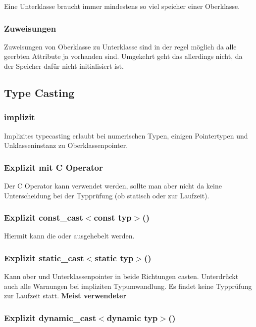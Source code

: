 Eine Unterklasse braucht immer mindestens so viel speicher einer Oberklasse.

\subsubsection{Zuweisungen}

Zuweisungen von Oberklasse zu Unterklasse sind in der regel möglich da alle geerbten Attribute ja vorhanden sind. 
Umgekehrt geht das allerdings nicht, da der Speicher dafür nicht initialisiert ist.

\subsection{Type Casting}

\subsubsection{implizit}

Implizites typecasting erlaubt bei numerischen Typen, einigen Pointertypen und Unklasseninstanz zu Oberklassenpointer. 

\subsubsection{Explizit mit C Operator}

Der C Operator \say{()} kann verwendet werden, sollte man aber nicht da keine Unterscheidung bei der Typprüfung (ob statisch oder zur Laufzeit). 

\subsubsection{Explizit const\_cast$<$const typ$>$()}

Hiermit kann die  oder  ausgehebelt werden. 


\subsubsection{Explizit static\_cast$<$static typ$>$()}

Kann ober und Unterklassenpointer in beide Richtungen casten. 
Unterdrückt auch alle Warnungen bei impliziten Typumwandlung. 
Es findet keine Typprüfung zur Laufzeit statt. 
\textbf{Meist verwendeter}


\subsubsection{Explizit dynamic\_cast$<$dynamic typ$>$()}

